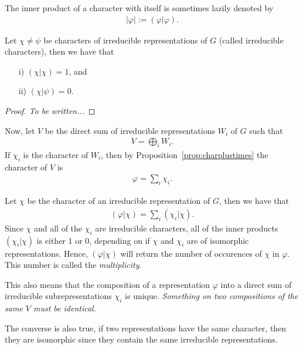 \begin{notation}
	The inner product of a character with itself is sometimes lazily denoted by \begin{align*}
		|\varphi| := (\varphi|\varphi).
	\end{align*}
\end{notation}

\begin{theorem}\label{thm:irredcrit}
	Let $\chi \neq \psi$ be characters of irreducible representations of $G$ (called irreducible characters), then we have that 
	\begin{enumerate}
		\item[i)] $(\chi|\chi)= 1$, and
		\item[ii)] $(\chi|\psi) = 0$.
	\end{enumerate}
\end{theorem}
\begin{proof}
	\textit{To be written...}
\end{proof}

Now, let $V$ be the direct sum of irreducible representations $W_i$ of $G$ such that
\begin{align*}
	V = \bigoplus_i W_i.
\end{align*}
If $\chi_i$ is the character of $W_i$, then by Proposition~\ref{prop:charplustimes} the character of $V$ is
\begin{align*}
	\varphi = \sum_i \chi_i.
\end{align*}

Let $\chi$ be the character of an irreducible representation of $G$, then we have that
\begin{align*}
	(\varphi|\chi) = \sum_i (\chi_i|\chi).
\end{align*}
Since $\chi$ and all of the $\chi_i$ are irreducible characters, all of the inner products $(\chi_i|\chi)$ is either 1 or 0, depending on if $\chi$ and $\chi_i$ are of isomorphic representations. Hence, $(\varphi|\chi)$ will return the number of occurences of $\chi$ in $\varphi$. This number is called the \textit{multiplicity}.

\begin{remark}
	This also means that the composition of a representation $\varphi$ into a direct sum of irreducible subrepresentations $\chi_i$ is unique. \textit{Something on two compositions of the same $V$ must be identical.}
\end{remark}

\begin{remark}
	The converse is also true, if two representations have the same character, then they are isomorphic since they contain the same irreducible representations.
\end{remark}

